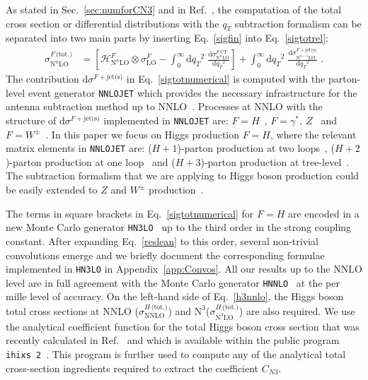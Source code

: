 \documentclass[12pt]{article}
\DeclareRobustCommand{\qt}{\ensuremath{q_T}\xspace}
\DeclareRobustCommand{\rd}{\ensuremath{\mathrm{d}}}
\DeclareRobustCommand{\cH}{\ensuremath{\mathcal{H}}}
\DeclareRobustCommand{\jets}{\text{jet(s)}\xspace}
\DeclareRobustCommand{\CT}{\text{CT}\xspace}
\DeclareRobustCommand{\tot}{\text{(tot.)}\xspace}
\DeclareRobustCommand{\LO}{\text{LO}\xspace}
\DeclareRobustCommand{\NNLO}{\text{NNLO}\xspace}
\DeclareRobustCommand{\N}[1]{\ensuremath{\text{N}^{#1}}} %
\begin{document}
As stated in Sec.~\ref{sec:numforCN3} and in Ref.~\cite{Catani:2007vq}, the computation of the total cross section or differential distributions with the  $\qt$ subtraction formalism can be separated into two main parts by inserting Eq.~\eqref{sigfin} into Eq.~\eqref{sigtotrel}:
\begin{align}
  \sigma^{F\,\tot}_{\N{n}\LO}
  &=
  \left[
    \cH^F_{\N{n}\LO} \otimes \sigma^F_{\LO}
    - \int_0^\infty\rd\qt^2 \; \frac{\rd\sigma^{F\,\CT}_{\N{n}\LO}}{\rd\qt^2} 
  \right]
  + \int_0^\infty\rd\qt^2 \; \frac{\rd\sigma^{F+\jets}_{\N{n-1}\LO}}{\rd\qt^2} \;.
  \label{sigtotnumerical} 
\end{align}
The contribution $\rd{\sigma}^{F+\jets}$ in Eq.~\eqref{sigtotnumerical} is computed with the parton-level event generator \texttt{NNLOJET} which provides the necessary infrastructure for the antenna subtraction method up to NNLO~\cite{Antenna:method}. 
Processes at NNLO with the structure of $\rd{\sigma}^{F+\jets}$ implemented in \texttt{NNLOJET} are: $F=H$~\cite{Chen:2016zka}, $F=\gamma^*,~Z$~\cite{Ridder:2015dxa,Gehrmann-DeRidder:2016jns} and $F=W^{\pm}$~\cite{Gehrmann-DeRidder:2017mvr}. In this paper we focus on Higgs production $F=H$, where the relevant matrix elements in 
 \texttt{NNLOJET} are: ($H+1$)-parton production at two loops~\cite{Gehrmann:2011aa}, ($H+2$)-parton production at one loop~\cite{Dixon:2009uk,Badger:2009hw,Badger:2009vh} and ($H+3$)-parton 
 production at tree-level~\cite{DelDuca:2004wt,Dixon:2004za,Badger:2004ty}. The subtraction formalism that we are applying to Higgs boson production could be easily extended  to $Z$ and $W^{\pm}$ production~\cite{leaninprep}.

The terms in square brackets in Eq.~\eqref{sigtotnumerical}  for $F=H$ are encoded in a new Monte Carlo generator \texttt{HN3LO}~\cite{leaninprepHN3LO} up to the third order in the strong coupling constant. After expanding Eq.~\eqref{reslean} to this order, several non-trivial convolutions emerge and we briefly document the corresponding formulae implemented in \texttt{HN3LO} in Appendix~\ref{app:Convos}. All our results up to the NNLO level are in full agreement with the Monte Carlo generator \texttt{HNNLO}~\cite{Catani:2007vq} at the per mille level of accuracy. On the left-hand side of Eq.~\eqref{h3nnlo}, the Higgs boson total cross sections at NNLO ($\sigma^{H\,\tot}_{\NNLO}$) and \N3\LO  ($\sigma^{H\,\tot}_{\N{3}\LO}$) are also required. 
We use the analytical coefficient function for the total Higgs boson cross section that was recently calculated in Ref.~\cite{Mistlberger:2018etf} and which is available within the public program \texttt{ihixs 2}~\cite{Dulat:2018rbf}.
This program is further used to compute any of the analytical total cross-section ingredients required to extract the coefficient $C_{N3}$.
\end{document}
